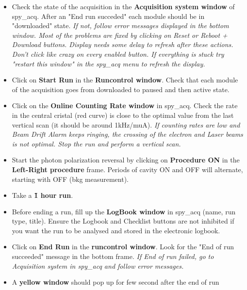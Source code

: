{\begin{itemize}
\begin{itemize}
\item Check Random, Mouly and central cristal are activated.
\item Check {\bf Raw data rates}. Assuming a trigger rate of 1kHz/muA, 
   prescaler factors should keep the read data rates at the few kHz level.
\item Check the trigger condition in {\bf General Daq setup} (Photon only, 
   e only, coinc, ...). 
\end{itemize}
\item Check the state of the acquisition in the {\bf Acquisition system window} 
of spy\_acq. After an "End run succeded" each module should be in "downloaded" 
state. 
{\it If not, follow error messages displayed in the bottom window. Most of 
the problems are fixed by clicking on Reset or Reboot + Download buttons. Display needs 
some delay to refresh after these  actions. Don't click like crazy on every 
enabled button. If everything is stuck try "restart this window" in the 
spy\_acq menu to refresh the display.}
\item Click on {\bf Start Run} in the {\bf Runcontrol window}. Check that 
each module of the acquisition goes from downloaded to paused and then active 
state.
\item Click on the {\bf Online Counting Rate window} in spy\_acq. Check the rate 
in the central cristal (red curve) is close to the optimal value from the last 
vertical scan (it should be around 1kHz/muA).
{\it If counting rates are low and Beam Drift Alarm keeps ringing, the 
crossing of the electron and Laser beams is not optimal. Stop the run and 
perform a 
vertical scan.}
\item Start the photon polarization reversal by clicking on {\bf Procedure ON} 
in the {\bf Left-Right procedure} frame. Periods of cavity ON and OFF will 
alternate, starting with OFF (bkg measurement).
\item Take a {\bf \~1 hour run}.
\item Before ending a run, fill up the {\bf LogBook window} in spy\_acq (name, 
run type, title). Ensure the Logbook and Checklist buttons are not inhibited
if you want the run to be analysed and stored in the electronic logbook.
\item Click on {\bf End Run} in the {\bf runcontrol window}. Look for the 
"End of run succeeded" message in the bottom frame.
{\it If End of run failed, go to Acquisition system in spy\_acq and follow 
error messages.}
\item A {\bf yellow window} should pop up for few second after the end of run 

\end{itemize}}
